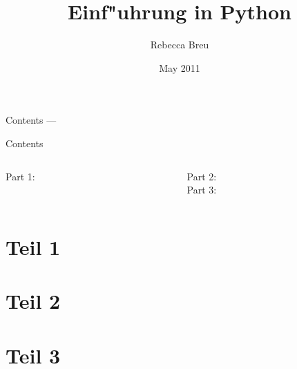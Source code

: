 \documentclass{beamer}
\title{Einf"uhrung in Python}
\date{May 2011}
\author{Rebecca Breu}
\institute
{
 Verteilte Systeme und Grid-Computing \\
 JSC\\
 Forschungszentrum J"ulich
}
\begin{document}
\AtBeginPart
{
  \begin{frame}
  \titlepage
  \end{frame}

  \begin{frame}{Contents --- \insertpart}
  \tableofcontents
  \end{frame}
}


\AtBeginSection[]
{
   \begin{frame}{\insertsection}
       \tableofcontents[currentsection]
   \end{frame}
}


\begin{frame}
\titlepage
\end{frame}

\begin{frame}{Contents}
\begin{columns}[t]

\begin{column}{0.4\textwidth}
  Part 1:\\[3mm]
  \tableofcontents[part=1]
\end{column}

\begin{column}{0.6\textwidth}
  Part 2:\\[3mm]
  \tableofcontents[part=2]
  \vspace{7mm}
  Part 3:\\[3mm]
  \tableofcontents[part=3]
\end{column}

\end{columns}
\end{frame}


\part{Teil 1}









\vielspass

\part{Teil 2}





\vielspass

\part{Teil 3}





\vielspass
\end{document}

